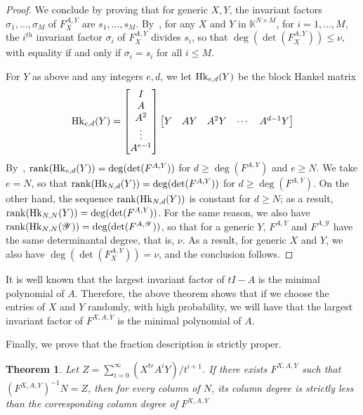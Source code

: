 \documentclass[12pt]{article}
\def\K {\ensuremath{\mathbb{K}}}
\newtheorem{theorem}[definition]{Theorem}
\def\K{\mathbb{K}}
\def\scrY{\mathscr{Y}}
\begin{document}
\begin{proof}
	We conclude by proving that for generic $X,Y$, the invariant factors
	$\sigma_1,\dots,\sigma_M$ of $F_X^{A,Y}$ are $s_1,\dots,s_M$.
	By~\cite[Theorem~2.12]{KaVi04}, for any $X$ and $Y$ in $\K^{N\times
		M}$, for $i=1,\dots,M$, the $i^{th}$ invariant factor $\sigma_i$ of
	$F_X^{A,Y}$ divides $s_i$, so that $\deg(\det(F_X^{A,Y}))\le\nu$, with
	equality if and only if $\sigma_i=s_i$ for all $i \le M$.
	
	For $Y$ as above and any integers $e,d$, we let ${\rm Hk}_{e,d}(Y)$ be
	the block Hankel matrix
	$$ {\rm Hk}_{e,d}(Y) =
	\begin{bmatrix}
	I \\  A \\  A^2 \\ \vdots  \\  A^{e-1}
	\end{bmatrix}
	\begin{bmatrix}
	Y & AY & A^2Y &\cdots&  A^{d-1}Y
	\end{bmatrix}
	$$ By~\cite[Eq.~(2.6)]{KaVi04}, ${\rm rank}({\rm Hk}_{e,d}(Y)) =
	\deg(\det(F^{A,Y}))$ for $d \ge \deg(F^{A,Y})$ and $e \ge N$.  We take
	$e=N$, so that ${\rm rank}({\rm Hk}_{N,d}(Y)) = \deg(\det(F^{A,Y}))$
	for $d \ge \deg(F^{A,Y})$. On the other hand, the sequence ${\rm
		rank}({\rm Hk}_{N,d}(Y))$ is constant for $d \ge N$; as a result,
	${\rm rank}({\rm Hk}_{N,N}(Y)) = \deg(\det(F^{A,Y}))$. For the same
	reason, we also have ${\rm rank}({\rm Hk}_{N,N}(\scrY)) =
	\deg(\det(F^{A,\scrY}))$, so that for a generic $Y$, $F^{A,Y}$ and
	$F^{A,\scrY}$ have the same determinantal degree, that is, $\nu$.  As
	a result, for generic $X$ and $Y$, we also have
	$\deg(\det(F_X^{A,Y}))=\nu$, and the conclusion follows.
\end{proof}

It is well known that the largest invariant factor of
$tI - A$ is the minimal polynomial of $A$. Therefore, the above
theorem shows that if we choose the entries of $X$ and $Y$
randomly, with high probability, we will have that the
largest invariant factor of $F^{X,A,Y}$ is the minimal
polynomial of $A$.

Finally, we prove that the fraction description is strictly proper.

\begin{theorem}
	Let $Z = \sum_{i=0}^{\infty} (X^{tr} A^i Y)/ t^{i+1}$. If there exists $F^{X,A,Y}$ such that
	$(F^{X,A,Y})^{-1} N = Z$, then for every column of $N$,
	its column degree is strictly less than the corresponding 
	column degree of $F^{X,A,Y}$ 
\end{theorem}
\end{document}
